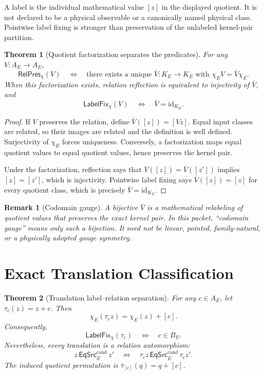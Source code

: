 \documentclass[11pt]{article}
\newtheorem{theorem}{Theorem}
\newtheorem{remark}{Remark}
\newcommand{\EqCand}{\mathsf{EqSrc}^{\mathrm{cand}}}
\newcommand{\LabelFix}{\mathsf{LabelFix}_{\chi}}
\newcommand{\RelPres}{\mathsf{RelPres}_{\chi}}
\begin{document}
A label is the individual mathematical value \([z]\) in the displayed
quotient. It is not declared to be a physical observable or a canonically
named physical class. Pointwise label fixing is stronger than preservation of
the unlabeled kernel-pair partition.

\begin{theorem}[Quotient factorization separates the predicates]
For any \(V:A_E\to A_E\),
\[
\RelPres(V)
\quad\Longleftrightarrow\quad
\text{there exists a unique }\bar V:K_E\to K_E
\text{ with }\chi_EV=\bar V\chi_E.
\]
When this factorization exists, relation reflection is equivalent to
injectivity of \(\bar V\), and
\[
\LabelFix(V)\quad\Longleftrightarrow\quad \bar V=\mathrm{id}_{K_E}.
\]
\end{theorem}

\begin{proof}
If \(V\) preserves the relation, define
\(\bar V([z])=[Vz]\). Equal input classes are related, so their images are
related and the definition is well defined. Surjectivity of \(\chi_E\)
forces uniqueness. Conversely, a factorization maps equal quotient values to
equal quotient values, hence preserves the kernel pair.

Under the factorization, reflection says that
\(\bar V([z])=\bar V([z'])\) implies \([z]=[z']\), which is injectivity.
Pointwise label fixing says
\(\bar V([z])=[z]\) for every quotient class, which is precisely
\(\bar V=\mathrm{id}_{K_E}\).
\end{proof}

\begin{remark}[Codomain gauge]
A bijective \(\bar V\) is a mathematical relabeling of quotient values that
preserves the exact kernel pair. In this packet, ``codomain gauge'' means only
such a bijection. It need not be linear, pointed, family-natural, or a
physically adopted gauge symmetry.
\end{remark}

\section{Exact Translation Classification}

\begin{theorem}[Translation label--relation separation]
For any \(c\in A_E\), let \(\tau_c(z)=z+c\). Then
\[
\chi_E(\tau_cz)=\chi_E(z)+[c].
\]
Consequently,
\[
\LabelFix(\tau_c)\quad\Longleftrightarrow\quad c\in B_E.
\]
Nevertheless, every translation is a relation automorphism:
\[
z\,\EqCand_E\,z'
\quad\Longleftrightarrow\quad
\tau_cz\,\EqCand_E\,\tau_cz'.
\]
The induced quotient permutation is
\(\bar\tau_{[c]}(q)=q+[c]\).
\end{theorem}
\end{document}
